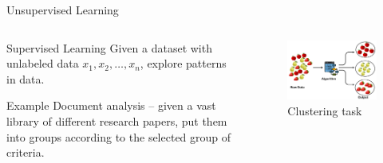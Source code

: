 \documentclass{beamer}
\begin{document}
    \begin{frame}{Unsupervised Learning}
        \begin{columns}
        \begin{column}{0.5\textwidth}
        \begin{block}{Supervised Learning}
        Given a dataset with unlabeled data $x_1,x_2,\dots,x_n$, explore patterns in data.
	    \end{block}

        \begin{exampleblock}{Example}
        Document analysis -- given a vast library of different research papers, put them into groups according to the selected group of criteria. 
        \end{exampleblock}
        \end{column}
        \begin{column}{0.5\textwidth}
            
        \begin{figure}
        \centering
            \includegraphics[width=\textwidth]{images/presentation/clustering.png}
            \caption{Clustering task}
        \end{figure}

        \end{column}
        \end{columns}
	\end{frame}
\end{document}
